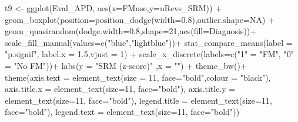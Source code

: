 \documentclass[a4paper, twoside]{templates/ociamthesis}
\newenvironment{Shaded}{\begin{snugshade}}{\end{snugshade}}
\newcommand{\AttributeTok}[1]{\textcolor[rgb]{0.77,0.63,0.00}{#1}}
\newcommand{\ConstantTok}[1]{\textcolor[rgb]{0.00,0.00,0.00}{#1}}
\newcommand{\DecValTok}[1]{\textcolor[rgb]{0.00,0.00,0.81}{#1}}
\newcommand{\FloatTok}[1]{\textcolor[rgb]{0.00,0.00,0.81}{#1}}
\newcommand{\FunctionTok}[1]{\textcolor[rgb]{0.00,0.00,0.00}{#1}}
\newcommand{\NormalTok}[1]{#1}
\newcommand{\OtherTok}[1]{\textcolor[rgb]{0.56,0.35,0.01}{#1}}
\newcommand{\SpecialCharTok}[1]{\textcolor[rgb]{0.00,0.00,0.00}{#1}}
\newcommand{\StringTok}[1]{\textcolor[rgb]{0.31,0.60,0.02}{#1}}
\renewenvironment{Shaded}
{
  \vspace{4pt}%
  \begin{snugshade}%
}{%
  \end{snugshade}%
  \vspace{4pt}%
}
\begin{document}
\begin{Shaded}
\begin{Highlighting}[]
\NormalTok{t9 }\OtherTok{\textless{}{-}} \FunctionTok{ggplot}\NormalTok{(Eval\_APD, }\FunctionTok{aes}\NormalTok{(}\AttributeTok{x=}\NormalTok{FMuse,}\AttributeTok{y=}\NormalTok{uRevs\_SRM)) }\SpecialCharTok{+}
    \FunctionTok{geom\_boxplot}\NormalTok{(}\AttributeTok{position=}\FunctionTok{position\_dodge}\NormalTok{(}\AttributeTok{width=}\FloatTok{0.8}\NormalTok{),}\AttributeTok{outlier.shape=}\ConstantTok{NA}\NormalTok{) }\SpecialCharTok{+} 
  \FunctionTok{geom\_quasirandom}\NormalTok{(}\AttributeTok{dodge.width=}\FloatTok{0.8}\NormalTok{,}\AttributeTok{shape=}\DecValTok{21}\NormalTok{,}\FunctionTok{aes}\NormalTok{(}\AttributeTok{fill=}\NormalTok{Diagnosis))}\SpecialCharTok{+}
  \FunctionTok{scale\_fill\_manual}\NormalTok{(}\AttributeTok{values=}\FunctionTok{c}\NormalTok{(}\StringTok{"blue"}\NormalTok{,}\StringTok{"lightblue"}\NormalTok{))}\SpecialCharTok{+}
  \FunctionTok{stat\_compare\_means}\NormalTok{(}\AttributeTok{label =}  \StringTok{"p.signif"}\NormalTok{, }\AttributeTok{label.x =} \FloatTok{1.5}\NormalTok{,}\AttributeTok{vjust =} \DecValTok{1}\NormalTok{) }\SpecialCharTok{+}
  \FunctionTok{scale\_x\_discrete}\NormalTok{(}\AttributeTok{labels=}\FunctionTok{c}\NormalTok{(}\StringTok{"1"} \OtherTok{=} \StringTok{"FM"}\NormalTok{, }\StringTok{"0"} \OtherTok{=} \StringTok{"No FM"}\NormalTok{))}\SpecialCharTok{+}
  \FunctionTok{labs}\NormalTok{(}\AttributeTok{y =} \StringTok{"SRM (z{-}score)"}\NormalTok{ ,}\AttributeTok{x =} \StringTok{""}\NormalTok{) }\SpecialCharTok{+}
  \FunctionTok{theme\_bw}\NormalTok{()}\SpecialCharTok{+}
  \FunctionTok{theme}\NormalTok{(}\AttributeTok{axis.text =} \FunctionTok{element\_text}\NormalTok{(}\AttributeTok{size =} \DecValTok{11}\NormalTok{, }\AttributeTok{face=}\StringTok{"bold"}\NormalTok{,}\AttributeTok{colour =} \StringTok{"black"}\NormalTok{),}
        \AttributeTok{axis.title.x =} \FunctionTok{element\_text}\NormalTok{(}\AttributeTok{size=}\DecValTok{11}\NormalTok{, }\AttributeTok{face=}\StringTok{"bold"}\NormalTok{),}
        \AttributeTok{axis.title.y =} \FunctionTok{element\_text}\NormalTok{(}\AttributeTok{size=}\DecValTok{11}\NormalTok{, }\AttributeTok{face=}\StringTok{"bold"}\NormalTok{),}
        \AttributeTok{legend.title =} \FunctionTok{element\_text}\NormalTok{(}\AttributeTok{size=}\DecValTok{11}\NormalTok{, }\AttributeTok{face=}\StringTok{"bold"}\NormalTok{),}
        \AttributeTok{legend.text  =} \FunctionTok{element\_text}\NormalTok{(}\AttributeTok{size=}\DecValTok{11}\NormalTok{, }\AttributeTok{face=}\StringTok{"bold"}\NormalTok{))}


\end{Highlighting}
\end{Shaded}
\end{document}
